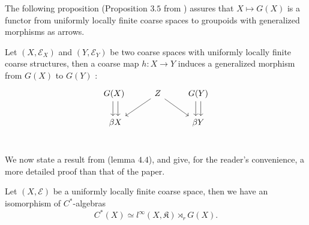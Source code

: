 The following proposition (Proposition $3.5$ from \cite{SkTuYu}) assures that $X\mapsto G(X)$ is a functor from uniformly locally finite coarse spaces to groupoids with generalized morphisms as arrows.\\

\begin{prop}
Let $(X,\mathcal E_X)$ and $(Y,\mathcal E_Y)$ be two coarse spaces with uniformly locally finite coarse structures, then a coarse map $h :X\rightarrow Y$ induces a generalized morphism from $G(X)$ to $G(Y)$ :
\[\begin{tikzcd}
G(X)\arrow[xshift=-0.7ex]{d}\arrow[xshift=0.7ex]{d} \ & \arrow{dl} Z \arrow{dr} & G(Y)\arrow[xshift=-0.7ex]{d}\arrow[xshift=0.7ex]{d} \\
\beta X & &\beta Y \\
\end{tikzcd}\] 
\end{prop}

We now state a result from \cite{SkTuYu} (lemma $4.4$), and give, for the reader's convenience, a more detailed proof than that of the paper.\\

\begin{prop}
Let $(X,\mathcal E)$ be a uniformly locally finite coarse space, then we have an isomorphism of $C^*$-algebras
\[C^*(X) \simeq l^\infty(X,\mathfrak K) \rtimes_r G(X).\]
\end{prop}

